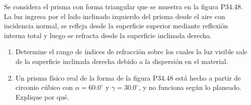 \item Se considera el prisma con forma triangular que se muestra en la figura P34.48. La luz ingresa por el lado inclinado izquierdo del prisma desde el aire con incidencia normal, se refleja desde la superficie superior mediante reflexión interna total y luego se refracta desde la superficie inclinada derecha.
\begin{enumerate}
    \item Determine el rango de índices de refracción sobre los cuales la luz visible sale de la superficie inclinada derecha debido a la dispersión en el material.
    \item Un prisma físico real de la forma de la figura P34.48 está hecho a partir de circonio cúbico con $\alpha = 60.0^\circ$ y $\gamma = 30.0^\circ$, y no funciona según lo planeado. Explique por qué.
\end{enumerate}